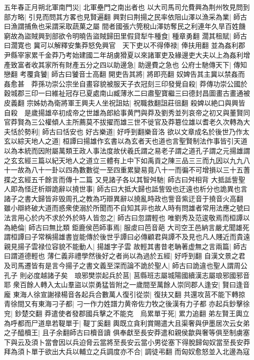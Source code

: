 五年春正月朔北軍南門災|{
	北軍壘門之南出者也}
以大司馬司允費興為荆州牧見問到部方略|{
	引見而問其方畧也見賢遍翻}
興對曰荆揚之民率依阻山澤以漁采為業|{
	師古曰漁謂捕魚也采謂采取蔬菓之屬}
間者國張六筦稅山澤妨奪民之利連年久旱百姓饑窮故為盜賊興到部欲令明曉告盜賊歸田里假貸犁牛種食|{
	種章勇翻}
濶其租賦|{
	師古曰濶寛也}
冀可以解釋安集莽怒免興官　天下吏以不得俸禄|{
	俸扶用翻}
並為姦利郡尹縣宰家累千金莽乃考始建國二年胡虜猾夏以來諸軍吏及緣邊吏大夫以上為姦利增產致富者收其家所有財產五分之四以助邊急|{
	助邊費之急也}
公府士馳傳天下|{
	傳知戀翻}
考覆貪饕|{
	師古曰饕音士高翻}
開吏告其將|{
	將即亮翻}
奴婢告其主冀以禁姦而姦愈甚　莽孫功崇公宗坐自畫容貌被服天子衣冠刻三印發覺自殺|{
	莽傳功崇公國於穀城郡三印一曰維祉冠存已夏處南山臧薄氷二曰肅聖寶繼三曰德封昌圖畫古畫通被皮義翻}
宗姊妨為衛將軍王興夫人坐祝詛姑|{
	祝職救翻詛莊徂翻}
殺婢以絶口與興皆自殺　是歲揚雄卒初成帝之世雄為郎給事黄門與莽及劉秀並列哀帝之初又與董賢同官莽賢為三公權傾人主所薦莫不拔擢而雄三世不徙官及莽簒位雄以耆老久次轉為大夫恬於勢利|{
	師古曰恬安也}
好古樂道|{
	好呼到翻樂音洛}
欲以文章成名於後世乃作太玄以綜天地人之道|{
	桓譚曰揚雄作玄書以為玄者天也道也言聖賢制法作事皆引天道以為本統而因附屬萬類王政人事法度故伏羲氏謂之易老子謂之道孔子謂之元揚雄謂之玄玄經三篇以紀天地人之道立三體有上中下如禹貢之陳三品三三而九因以九九八十一故為八十一卦以四為數數從一至四重累變易竟八十一而徧不可增損以三十五蓍揲之玄經五千餘言而傳十二篇}
又見諸子各以其智舛馳|{
	師古曰舛相背}
大抵詆訾聖人即為怪迂析辯詭辭以撓世事|{
	師古曰大抵大歸也詆訾毁也迂遠也析分也詭異也言諸子之書大歸皆非毁周孔之教為巧辯異辭以撓亂時政也訾音紫迂音于撓音火高翻}
雖小辯終破大道而惑衆使溺於所聞而不自知其非也故人時有問雄者常用法應之號曰法言用心於内不求於外於時人皆忽之|{
	師古曰忽謂輕也}
唯劉秀及范逡敬焉而桓譚以為絶倫|{
	師古曰無比類}
鉅鹿侯芭師事焉|{
	服䖍曰芭音葩}
大司空王邑納言嚴尤聞雄死謂桓譚曰子常稱揚雄書豈能傳於後世乎譚曰必傳顧君與譚不及見也凡人賤近而貴遠親見揚子雲禄位容貌不能動人|{
	揚雄字子雲}
故輕其書昔老聃著虚無之言兩篇|{
	師古曰謂道德輕也}
薄仁義非禮學然後好之者尚以為過於五經|{
	好呼到翻}
自漢文景之君及司馬遷皆有是言今揚子之書文義至深而論不詭於聖人|{
	師古曰詭違也聖人謂周公孔子}
則必度越諸子矣　琅邪樊崇起兵於莒|{
	莒縣班志屬城陽國續漢志屬琅邪國邪音耶}
衆百餘人轉入太山羣盜以崇勇猛皆附之一歲間至萬餘人崇同郡人逢安|{
	賢曰逢音龐}
東海人徐宣謝禄楊音各起兵合數萬人復引從崇|{
	復扶又翻}
共還攻莒不能下轉掠青徐間又有東海刁子都|{
	刁一作力姓譜力黄帝佐力牧之後漢有力子都}
亦起兵鈔擊徐兖|{
	鈔楚交翻}
莽遣使者發郡國兵擊之不能克　烏累單于死|{
	累力追翻}
弟左賢王輿立為呼都而尸道臯若鞮單于|{
	鞮丁奚翻}
輿既立貪利賞賜遣大且渠奢與伊墨居次云女弟之子醯櫝王|{
	且子余翻師古曰櫝音讀}
俱奉獻至長安莽遣和親侯歙與奢等俱至制虜塞下與云及須卜當會因以兵迫脅云當將至長安云當小男從塞下得脫歸匈奴當至長安莽拜為須卜單于欲出大兵以輔立之兵調度亦不合|{
	調徒弔翻}
而匈奴愈怒並入北邊為寇

